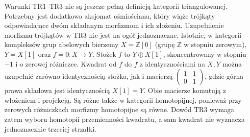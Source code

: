\begin{uwaga}
Warunki TR1--TR3 nie są jeszcze pełną definicją kategorii triangulowanej. Potrzebny jest dodatkowo aksjomat ośmiościanu, który wiąże trójkąty odpowiadające dwóm składanym morfizmom i ich złożeniu. Uzupełnienie morfizmu trójkątów w TR3 nie jest na ogół jednoznaczne. Istotnie, w kategorii kompleksów grup abelowych bierzemy $X=\mathbb Z[0]$ (grupę $\mathbb Z$ w stopniu zerowym), $Y=X[1]$ oraz $f=0:X\to Y$. Stożek $f$ to $Y\oplus X[1]$, skoncentrowany w stopniu $-1$ i o zerowej różniczce. Kwadrat od $f$ do $f$ z identycznościami na $X,Y$ można uzupełnić zarówno identycznością stożka, jak i macierzą $\left(\begin{smallmatrix}1&1\\0&1\end{smallmatrix}\right)$, gdzie górna prawa składowa jest identycznością $X[1]=Y$. Obie macierze komutują z włożeniem i projekcją. Są różne także w kategorii homotopijnej, ponieważ przy zerowych różniczkach morfizmy homotopijne są równe. Dowód TR3 wymaga zatem wyboru homotopii przemienności kwadratu, a sam kwadrat nie wyznacza jednoznacznie trzeciej strzałki.
\end{uwaga}

